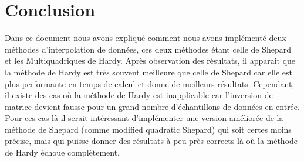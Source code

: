 \documentclass[a4paper,9pt]{article}
\begin{document}
\section{Conclusion}
\label{sec:conclusion}
Dans ce document nous avons expliqué comment nous avons implémenté deux méthodes d'interpolation de données, ces deux méthodes étant celle de Shepard et les Multiquadriques de Hardy. Après observation des résultats, il apparait que la méthode de Hardy est très souvent meilleure que celle de Shepard car elle est plus performante en temps de calcul et donne de meilleurs résultats. Cependant, il existe des cas où la méthode de Hardy est inapplicable car l'inversion de matrice devient fausse pour un grand nombre d'échantillons de données en entrée. Pour ces cas là il serait intéressant d'implémenter une version améliorée de la méthode de Shepard (comme modified quadratic Shepard) qui soit certes moins précise, mais qui puisse donner des résultats à peu près corrects là où la méthode de Hardy échoue complètement.
\end{document}
